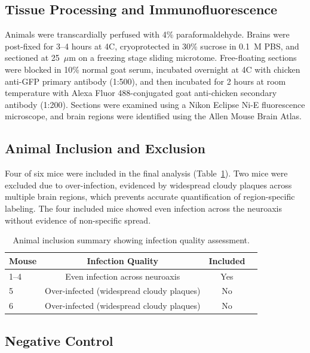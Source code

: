 \documentclass[12pt]{article}
\begin{document}
\subsection{Tissue Processing and Immunofluorescence}

Animals were transcardially perfused with 4\% paraformaldehyde. Brains were post-fixed for 3--4 hours at 4\textdegree C, cryoprotected in 30\% sucrose in 0.1~M PBS, and sectioned at 25~$\mu$m on a freezing stage sliding microtome. Free-floating sections were blocked in 10\% normal goat serum, incubated overnight at 4\textdegree C with chicken anti-GFP primary antibody (1:500), and then incubated for 2 hours at room temperature with Alexa Fluor 488-conjugated goat anti-chicken secondary antibody (1:200). Sections were examined using a Nikon Eclipse Ni-E fluorescence microscope, and brain regions were identified using the Allen Mouse Brain Atlas.

\subsection{Animal Inclusion and Exclusion}

Four of six mice were included in the final analysis (Table~\ref{tab:inclusion}). Two mice were excluded due to over-infection, evidenced by widespread cloudy plaques across multiple brain regions, which prevents accurate quantification of region-specific labeling. The four included mice showed even infection across the neuroaxis without evidence of non-specific spread.

\begin{table}[ht]
\centering
\caption{Animal inclusion summary showing infection quality assessment.}
\label{tab:inclusion}
\begin{tabular}{lccc}
\toprule
\textbf{Mouse} & \textbf{Infection Quality} & \textbf{Included} \\
\midrule
1--4 & Even infection across neuroaxis & Yes \\
5 & Over-infected (widespread cloudy plaques) & No \\
6 & Over-infected (widespread cloudy plaques) & No \\
\bottomrule
\end{tabular}
\end{table}

\subsection{Negative Control}
\end{document}
